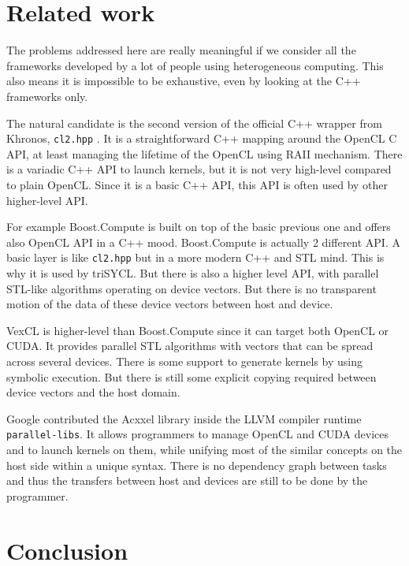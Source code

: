 \documentclass[sigplan]{acmart}
\begin{document}


\section{Related work}
\label{sec:related-work}

The problems addressed here are really meaningful if we consider all
the frameworks developed by a lot of people using heterogeneous
computing. This also means it is impossible to be exhaustive, even by
looking at the C++ frameworks only.

The natural candidate is the second version of the official C++
wrapper from Khronos, \texttt{cl2.hpp} \cite{cl2.hpp}. It is a
straightforward C++ mapping around the OpenCL C API, at least managing
the lifetime of the OpenCL using RAII mechanism. There is a variadic
C++ API to launch kernels, but it is not very high-level compared
to plain OpenCL. Since it is a basic C++ API, this API is often
used by other higher-level API.

For example Boost.Compute \cite{Boost.Compute} is built on top of the
basic previous one and offers also OpenCL API in a C++ mood.
Boost.Compute is actually 2 different API. A basic layer is like
\texttt{cl2.hpp} but in a more modern C++ and STL mind. This is why it
is used by triSYCL. But there is also a higher level API, with
parallel STL-like algorithms operating on device vectors. But there is
no transparent motion of the data of these device vectors between host
and device.

VexCL \cite{VexCL} is higher-level than Boost.Compute since it can
target both OpenCL or CUDA. It provides parallel STL algorithms with
vectors that can be spread across several devices. There is some
support to generate kernels by using symbolic execution. But there is
still some explicit copying required between device vectors and the host domain.

Google contributed the Acxxel library \cite{Acxxel-4.0} inside the
LLVM compiler runtime \texttt{parallel-libs}. It allows programmers to manage
OpenCL and CUDA devices and to launch kernels on them, while unifying
most of the similar concepts on the host side within a unique
syntax. There is no dependency graph between tasks and thus the
transfers between host and devices are still to be done by the
programmer.


\section{Conclusion}
\label{sec:conclusion}
\end{document}
